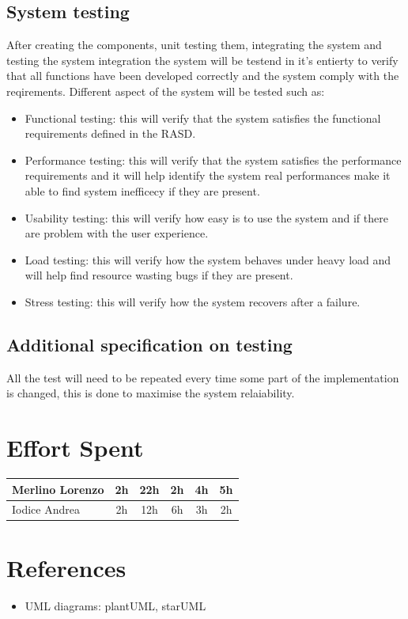 \documentclass{article}
\begin{document}
\subsection{System testing}
After creating the components, unit testing them, integrating the system and testing the system integration the system will be testend in it's entierty to verify that all functions have been developed correctly and the system comply with the reqirements. Different aspect of the system will be tested such as:
\begin{itemize}
\item Functional testing: this will verify that the system satisfies the functional requirements defined in the RASD.
\item Performance testing: this will verify that the system satisfies the performance requirements and it will help identify the system real performances make it able to find system inefficecy if they are present.
\item Usability testing: this will verify how easy is to use the system and if there are problem with the user experience.
\item Load testing: this will verify how the system behaves under heavy load and will help find resource wasting bugs if they are present.
\item Stress testing: this will verify how the system recovers after a failure.
\end{itemize}

\subsection{Additional specification on testing}
All the test will need to be repeated every time some part of the implementation is changed, this is done to maximise the system relaiability.

\newpage
\section{Effort Spent}
\begin{center}
\begin{tabular}{||l|c|c|c|c|c||}
\hline
Merlino Lorenzo & 2h & 22h & 2h & 4h & 5h
\\
\hline
Iodice Andrea & 2h & 12h & 6h & 3h & 2h
\\
\hline
\end{tabular}
\end{center}

\newpage
\section{References}
\begin{itemize}
\item UML diagrams: plantUML, starUML
\end{itemize}
\end{document}
